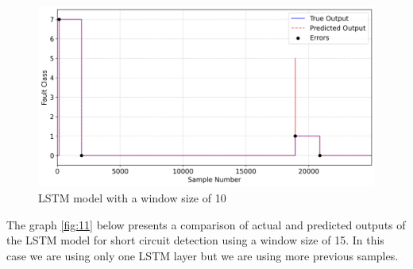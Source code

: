 \documentclass[11pt]{IEEEtran}
\begin{document}
\begin{figure}[H]
    \centering
    \includegraphics[width=\linewidth]{figs/true_vs_predicted_model_window_size_10.png}
    \caption{LSTM model with a window size of 10}
    \label{10}
\end{figure}

The graph \ref{fig:11} below presents a comparison of actual and predicted outputs of the LSTM model for short circuit detection using a window size of 15. In this case we are using only one LSTM layer but we are using more previous samples.
\end{document}
